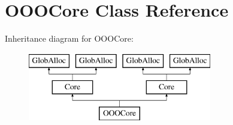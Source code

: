 \hypertarget{classOOOCore}{\section{O\-O\-O\-Core Class Reference}
\label{classOOOCore}
}
Inheritance diagram for O\-O\-O\-Core\-:\begin{figure}[H]
\begin{center}
\leavevmode
\includegraphics[height=3.000000cm]{classOOOCore}
\end{center}
\end{figure}
